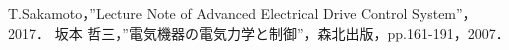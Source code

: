 \documentclass[a4paper,12pt]{jarticle}
\begin{document}
\vspace{3cm}
\begin{thebibliography}{99}
 T.Sakamoto，”Lecture Note of Advanced Electrical Drive Control System”，2017．
 坂本 哲三，”電気機器の電気力学と制御”，森北出版，pp.161-191，2007．
\end{thebibliography}
\end{document}
